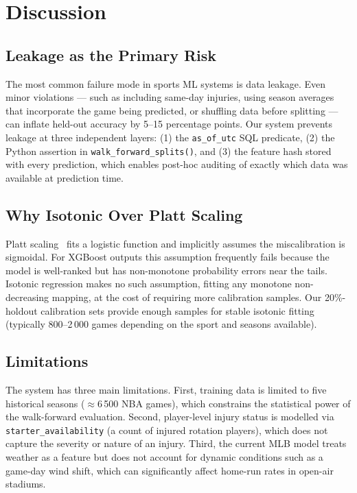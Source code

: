 \documentclass[conference]{IEEEtran}
\begin{document}
\section{Discussion}
\label{sec:discussion}

\subsection{Leakage as the Primary Risk}

The most common failure mode in sports ML systems is data leakage.
Even minor violations — such as including same-day injuries, using
season averages that incorporate the game being predicted, or shuffling
data before splitting — can inflate held-out accuracy by 5--15
percentage points.  Our system prevents leakage at three independent
layers: (1) the \texttt{as\_of\_utc} SQL predicate, (2) the Python
assertion in \texttt{walk\_forward\_splits()}, and (3) the feature
hash stored with every prediction, which enables post-hoc auditing of
exactly which data was available at prediction time.

\subsection{Why Isotonic Over Platt Scaling}

Platt scaling~\cite{platt1999} fits a logistic function and implicitly
assumes the miscalibration is sigmoidal.  For XGBoost outputs this
assumption frequently fails because the model is well-ranked but has
non-monotone probability errors near the tails.  Isotonic regression
makes no such assumption, fitting any monotone non-decreasing mapping,
at the cost of requiring more calibration samples.  Our 20\%-holdout
calibration sets provide enough samples for stable isotonic fitting
(typically 800--2\,000 games depending on the sport and seasons
available).

\subsection{Limitations}

The system has three main limitations.  First, training data is limited
to five historical seasons (\(\approx\)6\,500 NBA games), which
constrains the statistical power of the walk-forward evaluation.
Second, player-level injury status is modelled via \texttt{starter\_availability}
(a count of injured rotation players), which does not capture the
severity or nature of an injury.  Third, the current MLB model treats
weather as a feature but does not account for dynamic conditions such
as a game-day wind shift, which can significantly affect home-run rates
in open-air stadiums.
\end{document}
